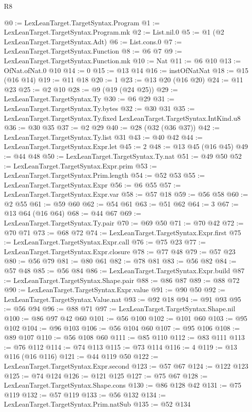 \begin{lexlean}{R8}
\begin{coremodule}
@0 := LexLeanTarget.TargetSyntax.Program
@1 := LexLeanTarget.TargetSyntax.Program.mk
@2 := List.nil.{0}
@5 := @1 (@2 LexLeanTarget.TargetSyntax.Adt)
@6 := List.cons.{0}
@7 := LexLeanTarget.TargetSyntax.Function
@8 := @6 @7
@9 := LexLeanTarget.TargetSyntax.Function.mk
@10 := Nat
@11 := @6 @10
@13 := OfNat.ofNat.{0} @10
@14 := 0
@15 := @13 @14
@16 := instOfNatNat
@18 := @15 (@16 @14)
@19 := @11 @18
@20 := 1
@23 := @13 @20 (@16 @20)
@24 := @11 @23
@25 := @2 @10
@28 := @9 (@19 (@24 @25))
@29 := LexLeanTarget.TargetSyntax.Ty
@30 := @6 @29
@31 := LexLeanTarget.TargetSyntax.Ty.bytes
@32 := @30 @31
@35 := LexLeanTarget.TargetSyntax.Ty.fixed LexLeanTarget.TargetSyntax.IntKind.u8
@36 := @30 @35
@37 := @2 @29
@40 := @28 (@32 (@36 @37))
@42 := LexLeanTarget.TargetSyntax.Ty.list @31
@43 := @40 @42
@44 := LexLeanTarget.TargetSyntax.Expr.let
@45 := 2
@48 := @13 @45 (@16 @45)
@49 := @44 @48
@50 := LexLeanTarget.TargetSyntax.Ty.nat
@51 := @49 @50
@52 := LexLeanTarget.TargetSyntax.Expr.prim
@53 := LexLeanTarget.TargetSyntax.Prim.length
@54 := @52 @53
@55 := LexLeanTarget.TargetSyntax.Expr
@56 := @6 @55
@57 := LexLeanTarget.TargetSyntax.Expr.var
@58 := @57 @18
@59 := @56 @58
@60 := @2 @55
@61 := @59 @60
@62 := @54 @61
@63 := @51 @62
@64 := 3
@67 := @13 @64 (@16 @64)
@68 := @44 @67
@69 := LexLeanTarget.TargetSyntax.Ty.pair
@70 := @69 @50
@71 := @70 @42
@72 := @70 @71
@73 := @68 @72
@74 := LexLeanTarget.TargetSyntax.Expr.first
@75 := LexLeanTarget.TargetSyntax.Expr.call
@76 := @75 @23
@77 := LexLeanTarget.TargetSyntax.Expr.closure
@78 := @77 @48
@79 := @57 @23
@80 := @56 @79
@81 := @80 @61
@82 := @78 @81
@83 := @56 @82
@84 := @57 @48
@85 := @56 @84
@86 := LexLeanTarget.TargetSyntax.Expr.build
@87 := LexLeanTarget.TargetSyntax.Shape.pair
@88 := @86 @87
@89 := @88 @72
@90 := LexLeanTarget.TargetSyntax.Expr.value
@91 := @90 @50
@92 := LexLeanTarget.TargetSyntax.Value.nat
@93 := @92 @18
@94 := @91 @93
@95 := @56 @94
@96 := @88 @71
@97 := LexLeanTarget.TargetSyntax.Shape.nil
@100 := @86 @97 @42 @60
@101 := @56 @100
@102 := @101 @60
@103 := @95 @102
@104 := @96 @103
@106 := @56 @104 @60
@107 := @95 @106
@108 := @89 @107
@110 := @56 @108 @60
@111 := @85 @110
@112 := @83 @111
@113 := @76 @112
@114 := @74 @113
@115 := @73 @114
@116 := 4
@119 := @13 @116 (@16 @116)
@121 := @44 @119 @50
@122 := LexLeanTarget.TargetSyntax.Expr.second
@123 := @57 @67
@124 := @122 @123
@125 := @74 @124
@126 := @121 @125
@127 := @75 @67
@128 := LexLeanTarget.TargetSyntax.Shape.cons
@130 := @86 @128 @42
@131 := @75 @119
@132 := @57 @119
@133 := @56 @132
@134 := LexLeanTarget.TargetSyntax.Prim.natSub
@135 := @52 @134

\end{coremodule}
\end{lexlean}
